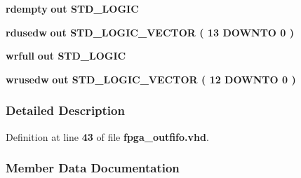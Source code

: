 \begin{DoxyCompactItemize}
\item 
{\bf rdempty}  {\bfseries {\bfseries \textcolor{keywordflow}{out}\textcolor{vhdlchar}{ }}} {\bfseries \textcolor{comment}{S\+T\+D\+\_\+\+L\+O\+G\+IC}\textcolor{vhdlchar}{ }} 
\item 
{\bf rdusedw}  {\bfseries {\bfseries \textcolor{keywordflow}{out}\textcolor{vhdlchar}{ }}} {\bfseries \textcolor{comment}{S\+T\+D\+\_\+\+L\+O\+G\+I\+C\+\_\+\+V\+E\+C\+T\+OR}\textcolor{vhdlchar}{ }\textcolor{vhdlchar}{(}\textcolor{vhdlchar}{ }\textcolor{vhdlchar}{ } \textcolor{vhdldigit}{13} \textcolor{vhdlchar}{ }\textcolor{keywordflow}{D\+O\+W\+N\+TO}\textcolor{vhdlchar}{ }\textcolor{vhdlchar}{ } \textcolor{vhdldigit}{0} \textcolor{vhdlchar}{ }\textcolor{vhdlchar}{)}\textcolor{vhdlchar}{ }} 
\item 
{\bf wrfull}  {\bfseries {\bfseries \textcolor{keywordflow}{out}\textcolor{vhdlchar}{ }}} {\bfseries \textcolor{comment}{S\+T\+D\+\_\+\+L\+O\+G\+IC}\textcolor{vhdlchar}{ }} 
\item 
{\bf wrusedw}  {\bfseries {\bfseries \textcolor{keywordflow}{out}\textcolor{vhdlchar}{ }}} {\bfseries \textcolor{comment}{S\+T\+D\+\_\+\+L\+O\+G\+I\+C\+\_\+\+V\+E\+C\+T\+OR}\textcolor{vhdlchar}{ }\textcolor{vhdlchar}{(}\textcolor{vhdlchar}{ }\textcolor{vhdlchar}{ } \textcolor{vhdldigit}{12} \textcolor{vhdlchar}{ }\textcolor{keywordflow}{D\+O\+W\+N\+TO}\textcolor{vhdlchar}{ }\textcolor{vhdlchar}{ } \textcolor{vhdldigit}{0} \textcolor{vhdlchar}{ }\textcolor{vhdlchar}{)}\textcolor{vhdlchar}{ }} 
\end{DoxyCompactItemize}


\subsubsection{Detailed Description}


Definition at line {\bf 43} of file {\bf fpga\+\_\+outfifo.\+vhd}.



\subsubsection{Member Data Documentation}
\paragraph[{ all }]{\hspace{0.3cm}{\ttfamily [Package]}}\label{classfpga__outfifo_a470a86ce8776f637b0483eabf2d92ad2}


